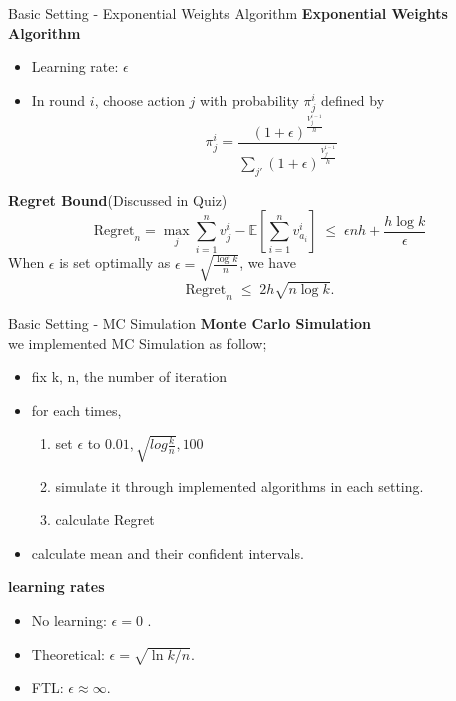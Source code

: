 \documentclass{beamer}
\begin{document}
\begin{frame}{Basic Setting - Exponential Weights Algorithm}
    \textbf{Exponential Weights Algorithm}\\[3pt]
    \begin{itemize}
        \item Learning rate: $\epsilon$
        \item In round $i$, choose action $j$ with probability $\pi_j^i$ defined by
        {\scriptsize
        \[
            \pi_j^i = 
            \frac{(1+\epsilon)^{\frac{V_j^{i-1}}{h}}}
            {\sum_{j'} (1+\epsilon)^{\frac{V_{j'}^{i-1}}{h}}}
        \]
        }
    \end{itemize}

    \vspace{2pt}
    \textbf{Regret Bound}(Discussed in Quiz)\\[3pt]
    \[
    \mathrm{Regret}_n 
    = 
    \max_j \sum_{i=1}^{n} v_j^i 
    - 
    \mathbb{E}\!\left[\sum_{i=1}^{n} v_{a_i}^i\right]
    \;\le\;
    \epsilon n h + \frac{h \log k}{\epsilon}
    \]
    When $\epsilon$ is set optimally as 
    $\epsilon = \sqrt{\frac{\log k}{n}}$, we have
    \[
    \mathrm{Regret}_n \;\le\; 2h\sqrt{n \log k}.
    \]
\end{frame}


\begin{frame}{Basic Setting - MC Simulation}
    \textbf{Monte Carlo Simulation}\\
    we implemented MC Simulation as follow;
    \begin{itemize}
        \item fix k, n, the number of iteration
        \item for each times, 
        \begin{enumerate}
            \item set $\epsilon$ to {$0.01, \sqrt{log\frac{k}{n}}, 100$}
            \item simulate it through implemented algorithms in each setting.
            \item calculate Regret
        \end{enumerate}
        \item calculate mean and their confident intervals.
    \end{itemize}
    \textbf{learning rates}\\
    \begin{itemize}
      \item No learning: \(\epsilon = 0\) .
      \item Theoretical: \(\epsilon = \sqrt{\ln k / n}\).
      \item FTL:  \(\epsilon \approx \infty\).
    \end{itemize}
\end{frame}
\end{document}
